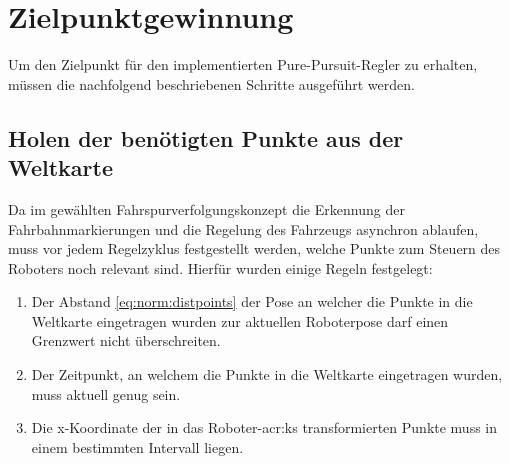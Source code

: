 \section{Zielpunktgewinnung}
Um den Zielpunkt für den implementierten \glqq Pure-Pursuit\grqq -Regler zu erhalten, müssen die nachfolgend beschriebenen Schritte ausgeführt werden.

\subsection{Holen der benötigten Punkte aus der Weltkarte}
Da im gewählten Fahrspurverfolgungskonzept die Erkennung der Fahrbahnmarkierungen und die Regelung des Fahrzeugs asynchron ablaufen, muss vor jedem Regelzyklus festgestellt werden, welche Punkte zum Steuern des Roboters noch relevant sind. Hierfür wurden einige Regeln festgelegt:
\begin{enumerate}
\item 
Der Abstand \eqref{eq:norm:distpoints} der Pose an welcher die Punkte in die Weltkarte eingetragen wurden zur aktuellen Roboterpose darf einen Grenzwert nicht überschreiten.
\item
Der Zeitpunkt, an welchem die Punkte in die Weltkarte eingetragen wurden, muss aktuell genug sein.
\item
Die x-Koordinate der in das Roboter-\gls{acr:ks} transformierten Punkte muss in einem bestimmten Intervall liegen.
\end{enumerate}
